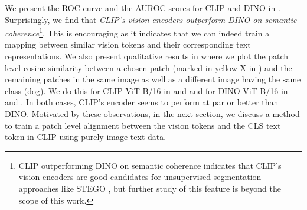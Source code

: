 \documentclass[10pt,twocolumn,letterpaper]{article}
\begin{document}
We present the ROC curve and the AUROC scores for CLIP and DINO in . Surprisingly, we find that \emph{CLIP's vision encoders outperform DINO on semantic coherence}\footnote{CLIP outperforming DINO on semantic coherence indicates that CLIP's vision encoders are good candidates for unsupervised segmentation approaches like STEGO \cite{hamilton2022unsupervised}, but further study of this feature is beyond the scope of this work.}. This is encouraging as it indicates that we can indeed train a mapping between similar vision tokens and their corresponding text representations. We also present qualitative results in  where we plot the patch level cosine similarity between a chosen patch (marked in yellow X in ) and the remaining patches in the same image as well as a different image having the same class (dog). We do this for CLIP ViT-B/16 in  and  and for DINO ViT-B/16 in  and . In both cases, CLIP's encoder seems to perform at par or better than DINO. Motivated by these observations, in the next section, we discuss a method to train a patch level alignment between the vision tokens and the CLS text token in CLIP using purely image-text data.
\end{document}
